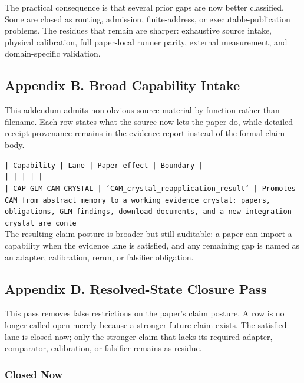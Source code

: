 \documentclass[11pt]{article}
\begin{document}
The practical consequence is that several prior gaps are now better classified. Some are closed as routing, admission, finite-address, or executable-publication problems. The residues that remain are sharper: exhaustive source intake, physical calibration, full paper-local runner parity, external measurement, and domain-specific validation.

\subsection*{Appendix B. Broad Capability Intake}

This addendum admits non-obvious source material by function rather than filename. Each row states what the source now lets the paper do, while detailed receipt provenance remains in the evidence report instead of the formal claim body.

\noindent\texttt{| Capability | Lane | Paper effect | Boundary |}\\
\noindent\texttt{|---|---|---|---|}\\
\noindent\texttt{| CAP-GLM-CAM-CRYSTAL | `CAM\_crystal\_reapplication\_result` | Promotes CAM from abstract memory to a working evidence crystal: papers, obligations, GLM findings, download documents, and a new integration crystal are conte}\\

The resulting claim posture is broader but still auditable: a paper can import a capability when the evidence lane is satisfied, and any remaining gap is named as an adapter, calibration, rerun, or falsifier obligation.

\subsection*{Appendix D. Resolved-State Closure Pass}

This pass removes false restrictions on the paper's claim posture. A row is no longer called open merely because a stronger future claim exists. The satisfied lane is closed now; only the stronger claim that lacks its required adapter, comparator, calibration, or falsifier remains as residue.

\subsubsection*{Closed Now}
\end{document}
